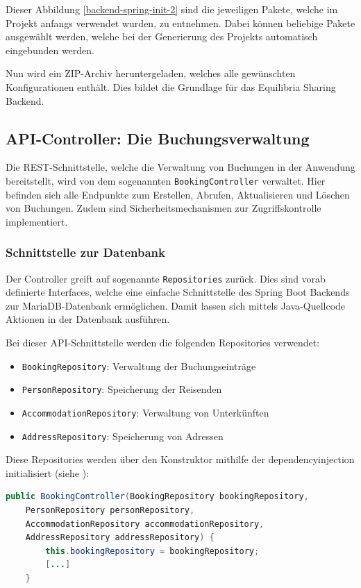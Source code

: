 Dieser Abbildung \ref{backend-spring-init-2} sind die jeweiligen Pakete, welche im Projekt anfangs verwendet wurden, zu entnehmen. Dabei können beliebige Pakete ausgewählt werden, welche bei der Generierung des Projekts automatisch eingebunden werden.

Nun wird ein ZIP-Archiv heruntergeladen, welches alle gewünschten Konfigurationen enthält. Dies bildet die Grundlage für das Equilibria Sharing Backend.

\subsection{API-Controller: Die Buchungsverwaltung}
\label{sec:apiDokumentation}
Die REST-Schnittstelle, welche die Verwaltung von Buchungen in der Anwendung bereitstellt, wird von dem sogenannten \texttt{BookingController} verwaltet. Hier befinden sich alle Endpunkte zum Erstellen, Abrufen, Aktualisieren und Löschen von Buchungen. Zudem sind Sicherheitsmechanismen zur Zugriffskontrolle implementiert. 

\subsubsection{Schnittstelle zur Datenbank}

Der Controller greift auf sogenannte \texttt{Repositories} zurück. Dies sind vorab definierte Interfaces, welche eine einfache Schnittstelle des Spring Boot Backends zur MariaDB-Datenbank ermöglichen. Damit lassen sich mittels Java-Quellcode Aktionen in der Datenbank ausführen.

Bei dieser API-Schnittstelle werden die folgenden Repositories verwendet:
\begin{itemize}
	\item \texttt{BookingRepository}: Verwaltung der Buchungseinträge
	\item \texttt{PersonRepository}: Speicherung der Reisenden
	\item \texttt{AccommodationRepository}: Verwaltung von Unterkünften
	\item \texttt{AddressRepository}: Speicherung von Adressen
\end{itemize}

Diese Repositories werden über den Konstruktor mithilfe der \gls{dependencyinjection} initialisiert (siehe \cite{website-spring-dependency-injection}):
\begin{lstlisting}[caption={Code-Ausschnit, welcher die Initalisierung aller notwendgen Klassen darstellt}, label={code-bookings-init}, language=Java]
	public BookingController(BookingRepository bookingRepository, 
	PersonRepository personRepository, 
	AccommodationRepository accommodationRepository,
	AddressRepository addressRepository) {
		this.bookingRepository = bookingRepository;
		[...]
	}
\end{lstlisting}

